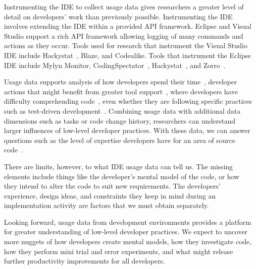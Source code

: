 Instrumenting the IDE to collect usage data gives researchers a greater level of detail on developers' work than previously possible. Instrumenting the IDE involves extending the IDE within a provided API framework.  Eclipse and Visual Studio support a rich API framework allowing logging of many commands and actions  as they occur.  Tools used for research that instrument the Visual Studio IDE include Hackystat~\cite{V:johnson2003beyond}, Blaze, and Codealike.  Tools that instrument the Eclipse IDE include Mylyn Monitor, CodingSpectator~\cite{VakilianETAL2012UseDisuseMisuse}, Hackystat~\cite{V:johnson2003beyond}, and Zorro~\cite{Kou2010Operational}.

Usage data supports analysis of how developers spend their time~\cite{V:johnson2003beyond}, developer actions that might benefit from greater tool support~\cite{V:MurphyHill2012How}, where developers have difficulty comprehending code~\cite{Carter2010Are}, even whether they are following specific practices such as test-driven development~\cite{Kou2010Operational}.  Combining usage data with additional data dimensions such as tasks or code change history, researchers can understand larger influences of low-level developer practices.  With these data, we can answer questions such as the level of expertise developers have for an area of source code~\cite{Fritz2010Degreeofknowledge}.

There are limits, however, to what IDE usage data can tell us.  The missing elements include things like  the developer's mental model of the code, or how they intend to alter the code to suit new requirements.  The developers' experience, design ideas, and constraints they keep in mind during an implementation activity are factors that we must obtain separately.  

Looking forward, usage data from development environments provides a platform for greater understanding of low-level developer practices.  We expect to uncover more nuggets of how developers create mental models, how they investigate code, how they perform mini trial and error experiments, and what might release further productivity improvements for all developers.
